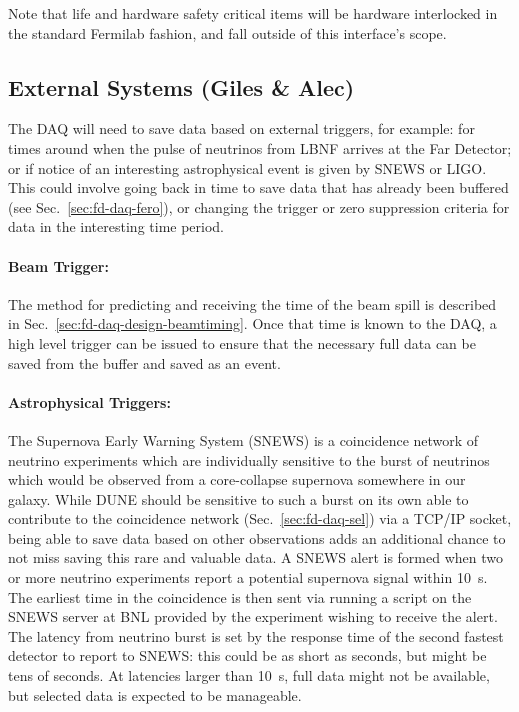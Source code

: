 Note that life and hardware safety critical items will be hardware
interlocked in the standard Fermilab fashion, and fall outside of this
interface's scope.


\subsection{External Systems (Giles \& Alec)}
\label{sec:fd-daq-intfc-ext}


The DAQ will need to save data based on external triggers, for
example: for times around when the pulse of neutrinos from LBNF
arrives at the Far Detector; or if notice of an interesting
astrophysical event is given by SNEWS\cite{snews} or LIGO.
This could involve going back in time to save data that has already
been buffered (see Sec.~\ref{sec:fd-daq-fero}), or changing the trigger
or zero suppression criteria for data in the interesting time period.


\paragraph{Beam Trigger:} The method for predicting and receiving the
time of the beam spill is described in
Sec.~\ref{sec:fd-daq-design-beamtiming}.
Once that time is known to the DAQ, a high level trigger can be issued
to ensure that the necessary full data can be saved from the buffer
and saved as an event.

\paragraph{Astrophysical Triggers:} The Supernova Early Warning System
(SNEWS) is a coincidence network of neutrino experiments which are
individually sensitive to the burst of neutrinos which would be
observed from a core-collapse supernova somewhere in our galaxy.
While DUNE should be sensitive to such a burst on its own able to
contribute to the coincidence network (Sec.~\ref{sec:fd-daq-sel}) via
a TCP/IP socket, being able to save data based on other observations
adds an additional chance to not miss saving this rare and valuable
data.
A SNEWS alert is formed when two or more neutrino experiments report a
potential supernova signal within \SI{10}{\s}.
The earliest time in the coincidence is then sent via running a script
on the SNEWS server at BNL provided by the experiment wishing to
receive the alert.
The latency from neutrino burst is set by the response time of the
second fastest detector to report to SNEWS: this could be as short as
seconds, but might be tens of seconds.
At latencies larger than \SI{10}{\s}, full data might not be
available, but selected data is expected to be manageable.

